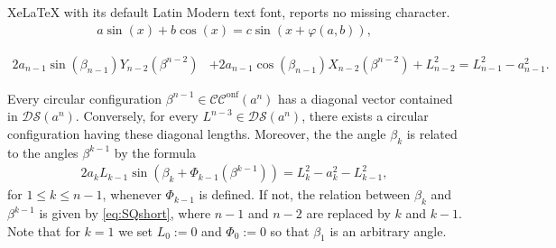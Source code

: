 \documentclass[10pt,a4paper]{amsart}
\newcommand{\Cc}{\mathcal{CC}^{\mathrm{onf}}}
\begin{document}
XeLaTeX with its default Latin Modern text font, reports no missing character.
\begin{align}\label{eq:addsincos}
a \sin\left( x \right) + b \cos\left( x\right) = c \sin\left(x + \varphi(a,b)  \right), 
\end{align}

\begin{align}\label{eq:SQshort}
2 a_{n-1} \sin\left( \beta_{n-1} \right) Y_{n-2}\left( \beta^{n-2} \right)  &+ 2a_{n-1} \cos\left( \beta_{n-1} \right) X_{n-2}\left( \beta^{n-2} \right) +  L_{n-2}^2 =  L_{n-1}^2 - a_{n-1}^2.  
\end{align}

\begin{theorem}\label{thm:sampling} Every circular configuration
\(\beta^{n-1}\in  \Cc(a^n)\)
has a diagonal vector contained in
\(\mathcal{DS}(a^n)\).
Conversely, for every
\(L^{n-3}\in\mathcal{DS}(a^n)\),
there exists a circular configuration having these diagonal lengths. Moreover, the the angle $\beta_k$ is related to the angles $\beta^{k-1}$ by the formula 
\begin{align}\label{eq:diagangle}
2 a_k L_{k-1}  \sin\left( \beta_k + \Phi_{k-1}\left( \beta^{k-1}\right)  \right) =  L_k^2  - a_k^2 - L_{k-1}^2,   
\end{align}
for $1 \leq k \leq n-1$, whenever $\Phi_{k-1}$ is defined. If not, the relation between $\beta_k$ and $\beta^{k-1}$ is given by \eqref{eq:SQshort}, where $n-1$ and $n-2$ are replaced by $k$ and $k-1$. Note that for $k=1$ we set $L_0 := 0$ and $\Phi_0 :=0$ so that $\beta_1$ is an arbitrary angle. 
\end{theorem}
\end{document}
